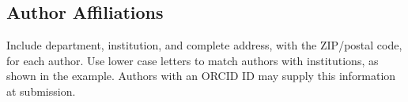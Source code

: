 \documentclass[9pt,twocolumn,twoside,lineno]{pnas-new}
\begin{document}
\subsection*{Author Affiliations}

Include department, institution, and complete address, with the ZIP/postal code, for each author. Use lower case letters to match authors with institutions, as shown in the example. Authors with an ORCID ID may supply this information at submission.

%

%

%

%
\end{document}
